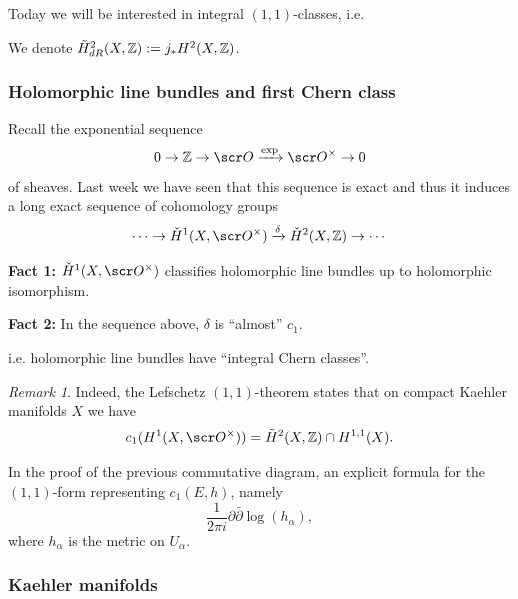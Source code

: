 \documentclass[A4paper, british, reqno]{amsart}
\theoremstyle{darkgreentheorem}
\theoremstyle{darkbluedefinition}
\theoremstyle{darkredexample}
\theoremstyle{remark}
\newtheorem{rem}[thm]{Remark}
\newcommand{\1}{\mathbbm{1}}
\begin{document}
Today we will be interested in integral $(1,1)$-classes, i.e.
\begin{center}
\end{center}
We denote $\tilde{H}_{dR}^{2}(X,\mathbb{Z}):= j_{*}H^{2}(X,\mathbb{Z})$.

\subsubsection{Holomorphic line bundles and first Chern class}

Recall the exponential sequence
\[ 0\to \Z\to \O\xrightarrow{\exp}\O^{\times}\to 0\]
of sheaves.
Last week we have seen that this sequence is exact and thus it induces a long exact sequence of cohomology groups
\[ \cdots \to \check{H}^{1}(X,\O^{\times})\xrightarrow{\delta} \check{H}^{2}(X,\Z)\to \cdots \]

\textbf{Fact 1:} $\check{H}^{1}(X,\O^{\times})$ classifies holomorphic line bundles up to holomorphic isomorphism.

\textbf{Fact 2:} In the sequence above, $\delta$ is ``almost'' $c_{1}$.
\begin{center}
\end{center}
i.e. holomorphic line bundles have ``integral Chern classes''.

\begin{rem}
    Indeed, the Lefschetz $(1,1)$-theorem states that on compact Kaehler manifolds $X$ we have
    \[ c_{1}(H^{1}(X,\O^{\times}))=\tilde{H}^{2}(X,\Z)\cap H^{1,1}(X). \]
\end{rem}

In the proof of the previous commutative diagram, an explicit formula for the $(1,1)$-form representing $c_{1}(E,h)$, namely
\[ \frac{1}{2\pi i}\partial \bar{\partial} \log(h_{\alpha}),\]
where $h_{\alpha}$ is the metric on $U_{\alpha}$.

\subsubsection{Kaehler manifolds}
\end{document}
